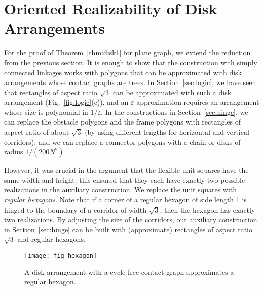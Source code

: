 \documentclass{llncs}
\begin{document}
\section{Oriented Realizability of Disk Arrangements\label{sec:disk}}

For the proof of Theorem~\ref{thm:disk1} for plane graph, we extend the reduction from the
previous section. It is enough to show that the construction with simply connected linkages
works with polygons that can be approximated with disk arrangements whose contact graphs are trees.
In Section~\ref{sec:logic}, we have seen that rectangles of aspect ratio $\sqrt{3}$ can be
approximated with such a disk arrangement (Fig.~\ref{fig:logic}(c)), and an $\varepsilon$-approximation requires an arrangement whose size is polynomial in $1/\varepsilon$. In the constructions in Section~\ref{sec:hinge}, we can replace the obstacle polygons and the frame polygons with rectangles of aspect ratio of about $\sqrt{3}$ (by using different lengths for horizontal and vertical corridors); and we can replace a connector polygons with a chain or disks of radius $1/(200N^2)$.

However, it was crucial in the argument that the flexible unit squares have the same width and height: this ensured that they each have exactly two possible realizations in the auxiliary construction.
We replace the unit squares with \emph{regular hexagons}. Note that if a corner of a regular hexagon of side length 1 is hinged to the boundary of a corridor of width $\sqrt{3}$, then the hexagon  has exactly two realizations. By adjusting the size of the corridors, our auxiliary construction in Section~\ref{sec:hinge} can be built with (approximate) rectangles of aspect ratio $\sqrt{3}$ and regular hexagons.

\begin{figure}[htbp]
  \centering
 \texttt{[image: fig-hexagon]}
\caption{\small A disk arrangement with a cycle-free contact graph approximates a regular hexagon.}
  \label{fig:hexagon}
\end{figure}
\end{document}
